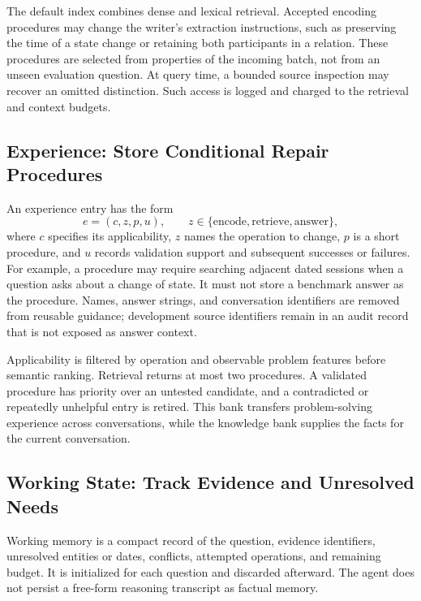 \documentclass{article}
\begin{document}
The default index combines dense and lexical retrieval. Accepted encoding
procedures may change the writer's extraction instructions, such as preserving
the time of a state change or retaining both participants in a relation.
These procedures are selected from properties of the incoming batch, not from
an unseen evaluation question. At query time, a bounded source inspection may
recover an omitted distinction. Such access is logged and charged to the
retrieval and context budgets.

\subsection{Experience: Store Conditional Repair Procedures}
An experience entry has the form
\begin{equation}
    e=(c,z,p,u),\qquad z\in\{\text{encode},\text{retrieve},\text{answer}\},
\end{equation}
where $c$ specifies its applicability, $z$ names the operation to change,
$p$ is a short procedure, and $u$ records validation support and subsequent
successes or failures. For example, a procedure may require searching adjacent
dated sessions when a question asks about a change of state. It must not store
a benchmark answer as the procedure. Names, answer strings, and conversation
identifiers are removed from reusable guidance; development source identifiers
remain in an audit record that is not exposed as answer context.

Applicability is filtered by operation and observable problem features before
semantic ranking. Retrieval returns at most two procedures. A validated
procedure has priority over an untested candidate, and a contradicted or
repeatedly unhelpful entry is retired. This bank transfers problem-solving
experience across conversations, while the knowledge bank supplies the facts
for the current conversation.

\subsection{Working State: Track Evidence and Unresolved Needs}
Working memory is a compact record of the question, evidence identifiers,
unresolved entities or dates, conflicts, attempted operations, and remaining
budget. It is initialized for each question and discarded afterward. The agent
does not persist a free-form reasoning transcript as factual memory.
\end{document}
